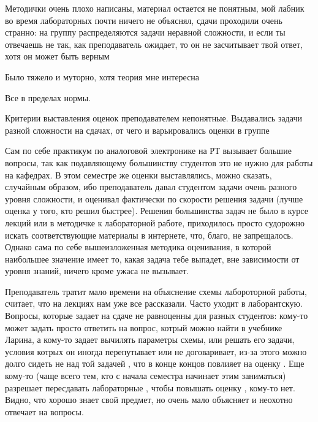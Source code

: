             \begin{commentbox} 
                Методички очень плохо написаны, материал остается не понятным, мой лабник во время лабораторных почти ничего не объяснял, сдачи проходили очень странно: на группу распределяются задачи неравной сложности, и если ты отвечаешь не так, как преподаватель ожидает, то он не засчитывает твой ответ, хотя он может быть верным 
            \end{commentbox} 
        
            \begin{commentbox} 
                Было тяжело и муторно, хотя теория мне интересна 
            \end{commentbox} 
        
            \begin{commentbox} 
                Все в пределах нормы. 
            \end{commentbox} 
        
            \begin{commentbox} 
                Критерии выставления оценок преподавателем непонятные. Выдавались задачи разной сложности на сдачах, от чего и варьировались оценки в группе 
            \end{commentbox} 
        
            \begin{commentbox} 
                Сам по себе практикум по аналоговой электронике на РТ вызывает большие вопросы, так как подавляющему большинству студентов это не нужно для работы на кафедрах. В этом семестре же оценки выставлялись, можно сказать, случайным образом, ибо преподаватель давал студентом задачи очень разного уровня сложности, и оценивал фактически по скорости решения задачи (лучше оценка у того, кто решил быстрее). Решения большинства задач не было в курсе лекций или в методичке к лабораторной работе, приходилось просто судорожно искать соответствующие материалы в интернете, что, благо, не запрещалось. Однако сама по себе вышеизложенная методика оценивания, в которой наибольшее значение имеет то, какая задача тебе выпадет, вне зависимости от уровня знаний, ничего кроме ужаса не вызывает. 
            \end{commentbox} 
        
            \begin{commentbox} 
                Преподаватель тратит мало времени на  объяснение схемы лабороторной работы, считает, что на лекциях нам уже все рассказали. Часто уходит в лаборантскую. Вопросы, которые задает на сдаче не равноценны для разных студентов: кому-то может задать просто ответить на вопрос, котрый можно найти в учебнике Ларина, а кому-то задает вычилять параметры схемы, или решать его задачи, условия котрых он иногда перепутывает или не договаривает, из-за этого можно долго сидеть не над той задачей , что в конце концов повлияет на оценку . Еще кому-то (чаще всего тем, кто с начала семестра начинает этим заниматься) разрешает пересдавать лабораторные , чтобы повышать оценку , кому-то нет. Видно, что хорошо знает свой предмет, но очень мало объясняет и неохотно отвечает на вопросы. 
            \end{commentbox}



